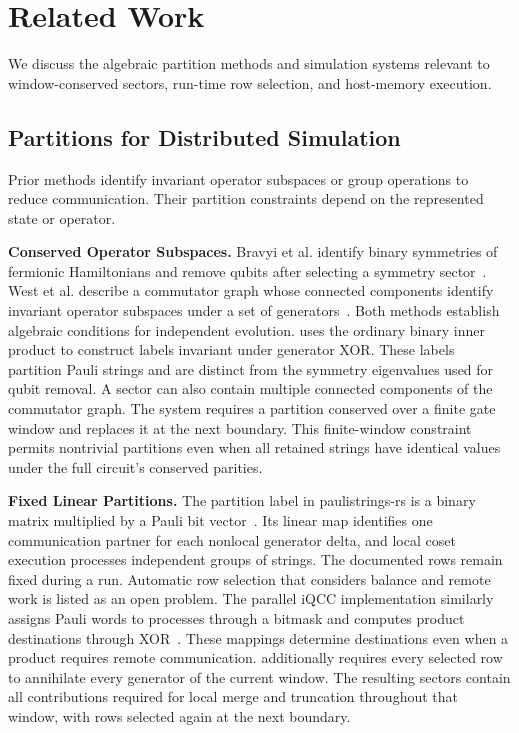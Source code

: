 \section{Related Work}
\label{sec:related}
We discuss the algebraic partition methods and simulation systems relevant to window-conserved sectors, run-time row selection, and host-memory execution.

\subsection{Partitions for Distributed Simulation}
Prior methods identify invariant operator subspaces or group operations to reduce communication.
Their partition constraints depend on the represented state or operator.

\noindent\textbf{Conserved Operator Subspaces.}
Bravyi et al. identify binary symmetries of fermionic Hamiltonians and remove qubits after selecting a symmetry sector~\cite{bravyi2017tapering}.
West et al. describe a commutator graph whose connected components identify invariant operator subspaces under a set of generators~\cite{west2025graph}.
Both methods establish algebraic conditions for independent evolution.
\SectorQ uses the ordinary binary inner product to construct labels invariant under generator XOR.
These labels partition Pauli strings and are distinct from the symmetry eigenvalues used for qubit removal.
A sector can also contain multiple connected components of the commutator graph.
The system requires a partition conserved over a finite gate window and replaces it at the next boundary.
This finite-window constraint permits nontrivial partitions even when all retained strings have identical values under the full circuit's conserved parities.

\noindent\textbf{Fixed Linear Partitions.}
The partition label in paulistrings-rs is a binary matrix multiplied by a Pauli bit vector~\cite{paulistrings}.
Its linear map identifies one communication partner for each nonlocal generator delta, and local coset execution processes independent groups of strings.
The documented rows remain fixed during a run.
Automatic row selection that considers balance and remote work is listed as an open problem.
The parallel iQCC implementation similarly assigns Pauli words to processes through a bitmask and computes product destinations through XOR~\cite{genin2025chemistry}.
These mappings determine destinations even when a product requires remote communication.
\SectorQ additionally requires every selected row to annihilate every generator of the current window.
The resulting sectors contain all contributions required for local merge and truncation throughout that window, with rows selected again at the next boundary.

